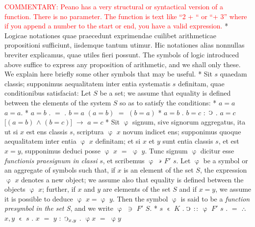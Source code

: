 \documentclass{book}
\newcommand{\C}{\mathop{\sbox0{$\displaystyle$$\reflectbox{C}$} %
\raisebox{-\height+\ht0-0.05cm}[\ht0][\dp0]{\scalebox{0.8}[0.8]{\copy0}}}\displaylimits} %
\newcommand{\pppNoSpace}{\leavevmode\lower0ex\hbox{.}\kern-0.1em\raise0.7ex\hbox{.}\kern-0.1em\lower0ex\hbox{.}} %
\newcommand{\such}{\thinspace \rotatebox[origin=c]{180}{$\epsilon$}}
\newcommand{\smallIn}{\ensuremath{\mathrel{\epsilon}}}
\newcommand\commentary[1]{\textcolor{red}{COMMENTARY: #1}}
\newenvironment{translateTwoCol}
               { %
                 \columnratio{0.5, 0.5} \begin{paracol}{2}
                 \newcommand{\LAT}{\switchcolumn[0]*}
                 \newcommand{\ENG}{\switchcolumn[1]}
               }
               { %
                 \let\ENG\undefined
                 \let\LAT\undefined
                 \end{paracol}
               }
\begin{document}
\begin{translateTwoCol}
\ENG
\commentary{Peano has a very structural or syntactical version of a function.  There is no parameter.  The function is text like ``2 + `` or ``+ 3'' where if you append a number to the start or end, you have a valid expression.}
\LAT  
Logicae notationes quae praecedunt exprimendae cuilibet arithmeticae propositioni sufficiunt, iisdemque tantum utimur. Hic notationes alias nonnullas breviter explicamus, quae utiles fieri possunt.
\ENG
The symbols of logic introduced above suffice to express any proposition of arithmetic, and we shall only these.  We explain here briefly some other symbols that may be useful.
\LAT
Sit $s$ quaedam classis; supponimus aequalitatem inter entia systematis $s$ definitam, quae conditionibus satisfaciat:
\ENG
Let $S$ be a set; we assume that equality is defined between the elements of the system $S$ so as to satisfy the conditions:
\LAT
\hspace{1.06cm} $a=a$
\ENG
\hspace{1.06cm} $a=a$.
\LAT
\hspace{1.06cm} $a=b$ $.$ $=$ $.$ $b=a$
\ENG
\hspace{1.06cm} $(a=b)$ $=$ $(b=a)$
\LAT
\hspace{1.06cm} $a=b$ . $b=c$ $:$ $\C$ $.$ $a=c$
\ENG
\hspace{1.06cm} $[(a=b)$ $\wedge$ $(b=c)]$ $\rightarrow$ $a=c$
\LAT
Sit $\upvarphi$ signum, sive signorum aggregatus, ita ut si $x$ est ens classis $s$, scriptura $\upvarphi$ $x$ novum indicet ens; supponimus quoque aequalitatem inter entia $\upvarphi$ $x$ definitam; et si $x$ et $y$ sunt entia classis $s$, et est $x=y$, supponimus deduci posse $\upvarphi$ $x$ $=$ $\upvarphi$ $y$. Tunc signum $\upvarphi$ dicitur esse \emph{functionis praesignum in classi} $s$, et scribemus $\upvarphi$ $\such$ $F'$ $s$.
\ENG
Let $\upvarphi$ be a symbol or an aggregate of symbols such that, if $x$ is an element of the set $S$, the expression $\upvarphi$ $x$ denotes a new object; we assume also that equality is defined between the objects $\upvarphi$ $x$; further, if $x$ and $y$ are elements of the set $S$ and if $x = y$, we assume it is possible to deduce $\upvarphi$ $x = \upvarphi$ $y$. Then the symbol $\upvarphi$ is said to be a \emph{function presymbol in the set S}, and we write $\upvarphi$ $\ni$ $F'$ $S$.
\LAT
\hspace{1.06cm} $s$ $\smallIn$ $K$ $.$ $\C$ $:\hspace{0.1em}:$ $\upvarphi$ $F'$ $s$ $.$ $=$ $\pppNoSpace$ $x,y$ $\smallIn$ $s$ $.$ $x$ $=$ $y$ $:$ $\C_{x,y}$ $.$ $\upvarphi x$ $=$ $\upvarphi y$

\end{translateTwoCol}
\end{document}
